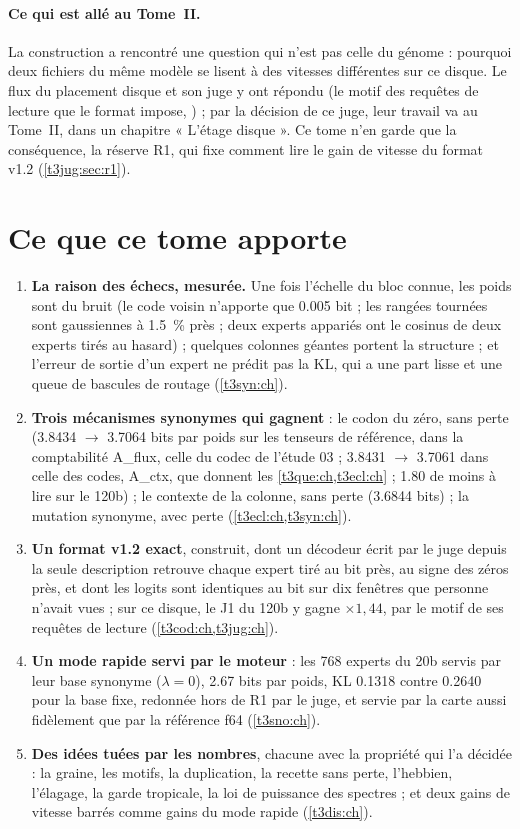 \paragraph{Ce qui est allé au Tome~II.} La construction a rencontré une question qui n'est pas celle du génome : pourquoi deux fichiers du même modèle se lisent à des vitesses différentes sur ce disque. Le flux du placement disque et son juge y ont répondu (le motif des requêtes de lecture que le format impose, ) ; par la décision de ce juge, leur travail va au Tome~II, dans un chapitre « L'étage disque ». Ce tome n'en garde que la conséquence, la réserve R1, qui fixe comment lire le gain de vitesse du format v1.2 (\cref{t3jug:sec:r1}).

\section{Ce que ce tome apporte}\label{t3int:sec:apports}

\begin{enumerate}
\item \textbf{La raison des échecs, mesurée.} Une fois l'échelle du bloc connue, les poids sont du bruit (le code voisin n'apporte que \num{0.005} bit ; les rangées tournées sont gaussiennes à \SI{1.5}{\percent} près ; deux experts appariés ont le cosinus de deux experts tirés au hasard) ; quelques colonnes géantes portent la structure ; et l'erreur de sortie d'un expert ne prédit pas la KL, qui a une part lisse et une queue de bascules de routage (\cref{t3syn:ch}).
\item \textbf{Trois mécanismes synonymes qui gagnent} : le codon du zéro, sans perte (\num{3.8434} $\to$ \num{3.7064} bits par poids sur les tenseurs de référence, dans la comptabilité A\_flux, celle du codec de l'étude 03 ; \num{3.8431} $\to$ \num{3.7061} dans celle des codes, A\_ctx, que donnent les \cref{t3que:ch,t3ecl:ch} ; \SI{1.80}{\Go} de moins à lire sur le 120b) ; le contexte de la colonne, sans perte (\num{3.6844} bits) ; la mutation synonyme, avec perte (\cref{t3ecl:ch,t3syn:ch}).
\item \textbf{Un format v1.2 exact}, construit, dont un décodeur écrit par le juge depuis la seule description retrouve chaque expert tiré au bit près, au signe des zéros près, et dont les logits sont identiques au bit sur dix fenêtres que personne n'avait vues ; sur ce disque, le J1 du 120b y gagne $\times 1{,}44$, par le motif de ses requêtes de lecture (\cref{t3cod:ch,t3jug:ch}).
\item \textbf{Un mode rapide servi par le moteur} : les 768 experts du 20b servis par leur base synonyme ($\lambda = 0$), \num{2.67} bits par poids, KL \num{0.1318} contre \num{0.2640} pour la base fixe, redonnée hors de R1 par le juge, et servie par la carte aussi fidèlement que par la référence f64 (\cref{t3sno:ch}).
\item \textbf{Des idées tuées par les nombres}, chacune avec la propriété qui l'a décidée : la graine, les motifs, la duplication, la recette sans perte, l'hebbien, l'élagage, la garde tropicale, la loi de puissance des spectres ; et deux gains de vitesse barrés comme gains du mode rapide (\cref{t3dis:ch}).
\end{enumerate}


